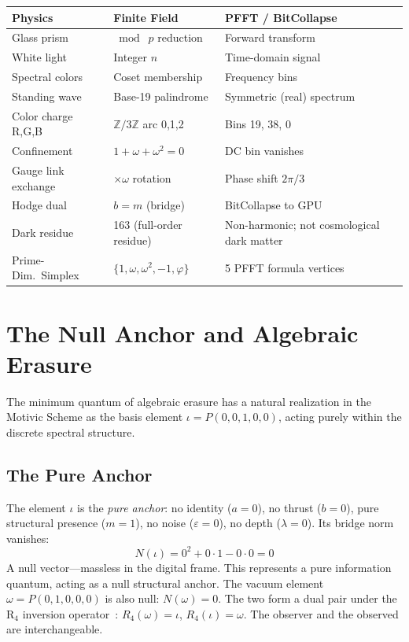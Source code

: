 \documentclass[12pt,oneside]{article}
\theoremstyle{principia}
\theoremstyle{definition}
\theoremstyle{remark}
\providecommand{\ZZ}{\mathbb{Z}}
\providecommand{\vp}{\varphi}
\begin{document}
\begin{center}
\begin{tabular}{@{}lll@{}}
\toprule
\textbf{Physics} & \textbf{Finite Field} & \textbf{PFFT / BitCollapse} \\
\midrule
Glass prism & $\bmod\; p$ reduction & Forward transform \\
White light & Integer $n$ & Time-domain signal \\
Spectral colors & Coset membership & Frequency bins \\
Standing wave & Base-19 palindrome & Symmetric (real) spectrum \\
Color charge R,G,B & $\ZZ/3\ZZ$ arc 0,1,2 & Bins 19, 38, 0 \\
Confinement & $1 + \omega + \omega^2 = 0$ & DC bin vanishes \\
Gauge link exchange & $\times\omega$ rotation & Phase shift $2\pi/3$ \\
Hodge dual & $b = m$ (bridge) & BitCollapse to GPU \\
Dark residue & 163 (full-order residue) & Non-harmonic; not cosmological dark matter \\
Prime-Dim.\ Simplex & $\{1, \omega, \omega^2, -1, \vp\}$ & 5 PFFT formula vertices \\
\bottomrule
\end{tabular}
\end{center}


\section{The Null Anchor and Algebraic Erasure}

The minimum quantum of algebraic erasure has a natural realization in the Motivic Scheme as the basis element $\iota = P(0, 0, 1, 0, 0)$, acting purely within the discrete spectral structure.

\subsection{The Pure Anchor}

The element $\iota$ is the \emph{pure anchor}: no identity ($a = 0$), no thrust ($b = 0$), pure structural presence ($m = 1$), no noise ($\varepsilon = 0$), no depth ($\lambda = 0$). Its bridge norm vanishes:
\[
N(\iota) = 0^2 + 0 \cdot 1 - 0 \cdot 0 = 0
\]
A null vector---massless in the digital frame. This represents a pure information quantum, acting as a null structural anchor. The vacuum element $\omega = P(0, 1, 0, 0, 0)$ is also null: $N(\omega) = 0$. The two form a dual pair under the R$_4$ inversion operator~\cite{larue_lc}: $R_4(\omega) = \iota$, $R_4(\iota) = \omega$. The observer and the observed are interchangeable.
\end{document}
